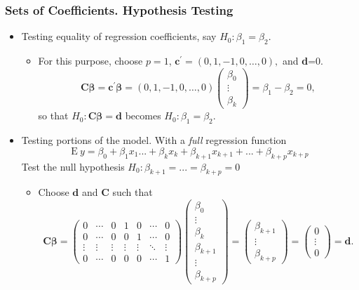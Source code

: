 \begin{frame}[shrink=5]
 \frametitle{Sets of Coefficients. Hypothesis Testing}
\begin{itemize}
\item Testing equality of regression
coefficients, say $H_{0}: \beta_1 = \beta_2.$
\begin{itemize}
\item For this purpose, choose
$p=1$, $\mathbf{c}^{\prime}= \left(0,1, -1, 0, \ldots, 0\right),$
and \textbf{d}=0.
\begin{equation*}
\mathbf{C \boldsymbol \beta = c^{\prime} \boldsymbol \beta}=
\left(0,1, -1, 0, \ldots, 0\right) \left(
\begin{array}{c}
\beta _0 \\
\vdots  \\
\beta _k
\end{array}
\right) =\beta_1 - \beta_2 = 0,
\end{equation*}
so that $H_{0}:\mathbf{C \boldsymbol \beta =d}$ becomes $H_{0}:
\beta_1 = \beta_2.$
  \end{itemize}
\item Testing portions of the model. With a \emph{full} regression
function
\begin{equation*}
\mathrm{E~}y=\beta _{0}+\beta _{1}x_{1}...+\beta _{k}x_{k}+\beta
_{k+1}x_{k+1}+...+\beta _{k+p}x_{k+p}
\end{equation*}%
Test the null hypothesis $H_{0}:\beta _{k+1}=...=\beta _{k+p}=0$
\begin{itemize}
\item Choose $\mathbf{d}$ and $\mathbf{C}$ such that
\begin{equation*}
\mathbf{C\boldsymbol \beta =}\left(
\begin{array}{ccccccc}
0 & \cdots  & 0 & 1 & 0 & \cdots  & 0 \\
0 & \cdots  & 0 & 0 & 1 & \cdots  & 0 \\
\vdots  & \vdots  & \vdots  & \vdots  & \vdots  & \ddots  & \vdots  \\
0 & \cdots  & 0 & 0 & 0 & \cdots  & 1%
\end{array}%
\right) \left(
\begin{array}{c}
\beta _{0} \\
\vdots  \\
\beta _{k} \\
\beta _{k+1} \\
\vdots  \\
\beta _{k+p}%
\end{array}%
\right) =\left(
\begin{array}{c}
\beta _{k+1} \\
\vdots  \\
\beta _{k+p}%
\end{array}%
\right) =\left(
\begin{array}{c}
0 \\
\vdots  \\
0
\end{array}%
\right) =\mathbf{d}.
\end{equation*}
  \end{itemize}
  \end{itemize}
\end{frame}


